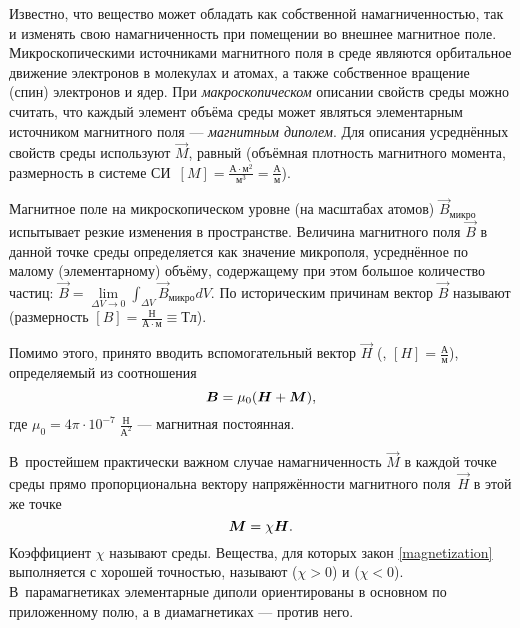 
Известно, что вещество может обладать как собственной намагниченностью, 
так и изменять свою намагниченность при помещении во внешнее магнитное поле.
Микроскопическими источниками магнитного поля в среде являются
орбитальное движение электронов в молекулах и атомах, а также собственное 
вращение (спин) электронов и ядер.
При \emph{макроскопическом} описании свойств среды можно считать,
что каждый элемент объёма среды может являться элементарным источником
магнитного поля --- \emph{магнитным диполем}. Для описания усреднённых
свойств среды используют  $\vec{M}$, равный
(объёмная плотность магнитного момента, размерность в 
системе СИ~$[M]=\frac{А\cdot м^2}{м^3}=\frac{А}{м}$).

Магнитное поле на микроскопическом уровне (на масштабах атомов) 
$\vec{B}_{\text{микро}}$ испытывает резкие изменения в пространстве.
Величина магнитного поля $\vec{B}$ в данной точке среды определяется как
значение микрополя, усреднённое по малому (элементарному) объёму, 
содержащему при этом большое количество частиц: 
$\vec{B}=\lim\limits_{\Delta V\to 0}\int_{\Delta V} \vec{B}_{микро}dV$.
По историческим причинам вектор $\vec{B}$ 
называют  
(размерность $[B] = \frac{Н}{А\cdot м}\equiv  Тл$).

Помимо этого, принято вводить вспомогательный вектор $\vec{H}$
(, $[H]=\frac{А}{м}$), определяемый 
из соотношения
\begin{equation}
    \eqmark{fieldB}
    \vec{B} = \mu_0(\vec{H} + \vec{M}),
\end{equation}
где $\mu_0=4\pi \cdot 10^{-7}\;\frac{Н}{А^2}$ --- магнитная постоянная.

В~простейшем практически важном случае намагниченность $\vec{M}$ в каждой
точке среды прямо пропорциональна вектору напряжённости магнитного
поля~$\vec{H}$ в этой же точке
\begin{equation}
    \eqmark{magnetization}
    \vec{M} = \chi\vec{H}.
\end{equation}
Коэффициент $\chi$ называют  среды.
Вещества, для которых закон \eqref{magnetization} выполняется
с хорошей точностью, называют  ($\chi > 0$) и
 ($\chi < 0$).
В~парамагнетиках элементарные диполи
ориентированы в основном по приложенному полю,
а в диамагнетиках --- против него.

